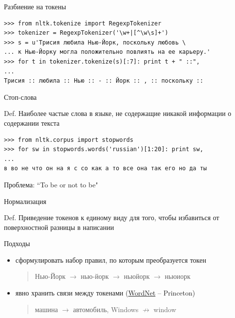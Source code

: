 \documentclass[10pt]{beamer}
\begin{document}
\begin{frame}[fragile]{Разбиение на токены}

\begin{shaded}
{\color{green}
\begin{verbatim}
>>> from nltk.tokenize import RegexpTokenizer
>>> tokenizer = RegexpTokenizer('\w+|[^\w\s]+')
>>> s = u'Трисия любила Нью-Йорк, поскольку любовь \
... к Нью-Йорку могла положительно повлиять на ее карьеру.'
>>> for t in tokenizer.tokenize(s)[:7]: print t + " ::",
... 
Трисия :: любила :: Нью :: - :: Йорк :: , :: поскольку ::
\end{verbatim}
}
\end{shaded}

\end{frame}


\begin{frame}[fragile]{Стоп-слова}

\begin{block}{Def.}
Наиболее частые слова в языке, не содержащие никакой информации о содержании текста
\end{block}

\begin{shaded}
{\color{green}
\begin{verbatim}
>>> from nltk.corpus import stopwords
>>> for sw in stopwords.words('russian')[1:20]: print sw,
... 
в во не что он на я с со как а то все она так его но да ты
\end{verbatim}
}
\end{shaded}

\vspace{1em}
Проблема: ``To be or not to be"

\end{frame}


\begin{frame}[fragile]{Нормализация}

\begin{block}{Def.}
Приведение токенов к единому виду для того, чтобы избавиться от поверхностной разницы в написании
\end{block}

\vspace{1em}
Подходы
\begin{itemize}
\item сформулировать набор правил, по которым преобразуется токен
\begin{quote}
Нью-Йорк $\rightarrow$ нью-йорк $\rightarrow$ ньюйорк $\rightarrow$ ньюиорк
\end{quote}
\item явно хранить связи между токенами (\href{http://wordnetweb.princeton.edu/perl/webwn}{WordNet} -- Princeton)
\begin{quote}
машина $\rightarrow$ автомобиль, Windows $\not \rightarrow$ window
\end{quote}
\end{itemize}

\end{frame}
\end{document}
